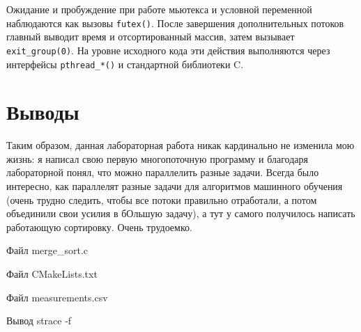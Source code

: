 \documentclass[12pt, a4paper]{article}
\begin{document}
Ожидание и пробуждение при работе мьютекса и условной переменной
наблюдаются как вызовы \texttt{futex()}. После завершения дополнительных
потоков главный выводит время и отсортированный массив, затем вызывает
\texttt{exit\_group(0)}. На уровне исходного кода эти действия выполняются
через интерфейсы \texttt{pthread\_*()} и стандартной библиотеки C.

\section{Выводы}

Таким образом, данная лабораторная работа никак кардинально не изменила
мою жизнь: я написал свою первую многопоточную программу и благодаря
лабораторной понял, что можно параллелить разные задачи. Всегда было
интересно, как параллелят разные задачи для алгоритмов машинного обучения
(очень трудно следить, чтобы все потоки правильно отработали, а потом
объединили свои усилия в бОльшую задачу), а тут у самого получилось
написать работающую сортировку. Очень трудоемко.


\begin{listingblock}{Файл merge\_sort.c}
\end{listingblock}

\begin{listingblock}{Файл CMakeLists.txt}
\end{listingblock}


\begin{listingblock}{Файл measurements.csv}
\end{listingblock}


\begin{listingblock}{Вывод strace -f}
\end{listingblock}
\end{document}
